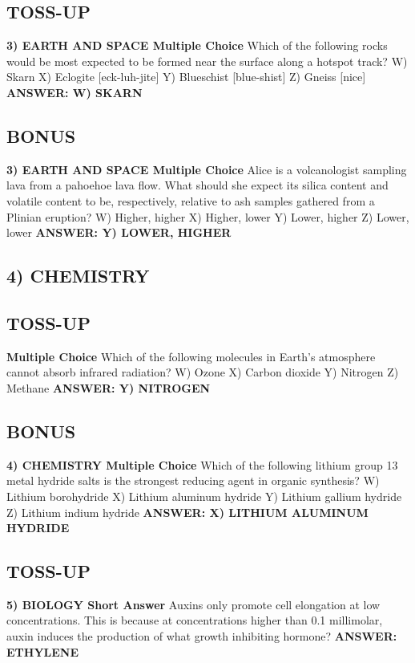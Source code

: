 \documentclass{article}
\begin{document}
\newpage

\subsection*{TOSS-UP}
\textbf{3) EARTH AND SPACE Multiple Choice} Which of the following rocks would be most expected to be formed near the surface along a hotspot track?
W) Skarn
X) Eclogite [eck-luh-jite]
Y) Blueschist [blue-shist]
Z) Gneiss [nice]
\textbf{ANSWER: W) SKARN}

\subsection*{BONUS}
\textbf{3) EARTH AND SPACE Multiple Choice} Alice is a volcanologist sampling lava from a pahoehoe lava flow. What should she expect its silica content and volatile content to be, respectively, relative to ash samples gathered from a Plinian eruption?
W) Higher, higher
X) Higher, lower
Y) Lower, higher
Z) Lower, lower
\textbf{ANSWER: Y) LOWER, HIGHER}

\newpage

\subsection*{4) CHEMISTRY}
\subsection*{TOSS-UP}
\textbf{Multiple Choice} Which of the following molecules in Earth's atmosphere cannot absorb infrared radiation?
W) Ozone
X) Carbon dioxide
Y) Nitrogen
Z) Methane
\textbf{ANSWER: Y) NITROGEN}

\subsection*{BONUS}
\textbf{4) CHEMISTRY Multiple Choice} Which of the following lithium group 13 metal hydride salts is the strongest reducing agent in organic synthesis?
W) Lithium borohydride
X) Lithium aluminum hydride
Y) Lithium gallium hydride
Z) Lithium indium hydride
\textbf{ANSWER: X) LITHIUM ALUMINUM HYDRIDE}

\subsection*{TOSS-UP}
\textbf{5) BIOLOGY Short Answer} Auxins only promote cell elongation at low concentrations. This is because at concentrations higher than 0.1 millimolar, auxin induces the production of what growth inhibiting hormone?
\textbf{ANSWER: ETHYLENE}
\end{document}
